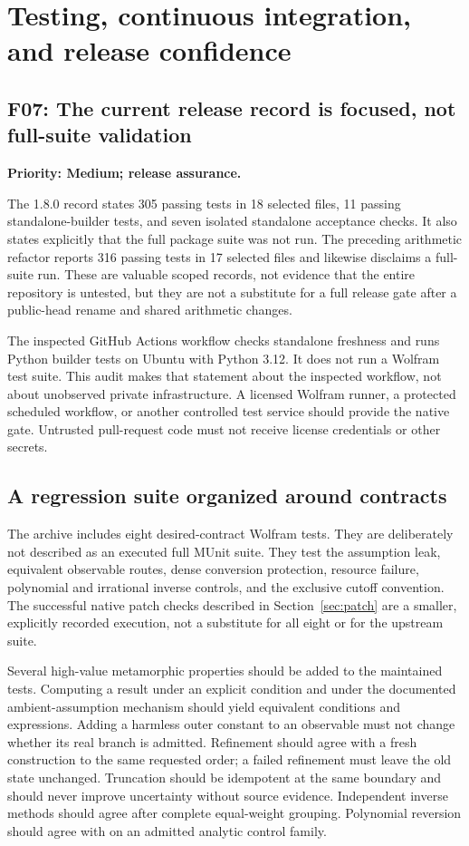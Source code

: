 \documentclass[11pt,a4paper]{article}
\newcommand{\code}[1]{\texttt{\detokenize{#1}}}
\newcommand{\finding}[3]{\Needspace{8\baselineskip}\subsection{#1: #2}\textbf{Priority: #3.}\par}
\begin{document}
\section{Testing, continuous integration, and release confidence}

\finding{F07}{The current release record is focused, not full-suite validation}{Medium; release assurance}
The 1.8.0 record states 305 passing tests in 18 selected files, 11 passing standalone-builder tests, and seven isolated standalone acceptance checks. It also states explicitly that the full package suite was not run. The preceding arithmetic refactor reports 316 passing tests in 17 selected files and likewise disclaims a full-suite run. These are valuable scoped records, not evidence that the entire repository is untested, but they are not a substitute for a full release gate after a public-head rename and shared arithmetic changes.\cite{repo-validation,repo-commit}

The inspected GitHub Actions workflow checks standalone freshness and runs Python builder tests on Ubuntu with Python 3.12. It does not run a Wolfram test suite. This audit makes that statement about the inspected workflow, not about unobserved private infrastructure. A licensed Wolfram runner, a protected scheduled workflow, or another controlled test service should provide the native gate. Untrusted pull-request code must not receive license credentials or other secrets.\cite{repo-workflow}

\subsection{A regression suite organized around contracts}
The archive includes eight desired-contract Wolfram tests. They are deliberately not described as an executed full MUnit suite. They test the assumption leak, equivalent observable routes, dense conversion protection, resource failure, polynomial and irrational inverse controls, and the exclusive cutoff convention. The successful native patch checks described in Section~\ref{sec:patch} are a smaller, explicitly recorded execution, not a substitute for all eight or for the upstream suite.

Several high-value metamorphic properties should be added to the maintained tests. Computing a result under an explicit condition and under the documented ambient-assumption mechanism should yield equivalent conditions and expressions. Adding a harmless outer constant to an observable must not change whether its real branch is admitted. Refinement should agree with a fresh construction to the same requested order; a failed refinement must leave the old state unchanged. Truncation should be idempotent at the same boundary and should never improve uncertainty without source evidence. Independent inverse methods should agree after complete equal-weight grouping. Polynomial reversion should agree with \code{InverseSeries} on an admitted analytic control family.\cite{repo-incremental,wl-inverse}
\end{document}
